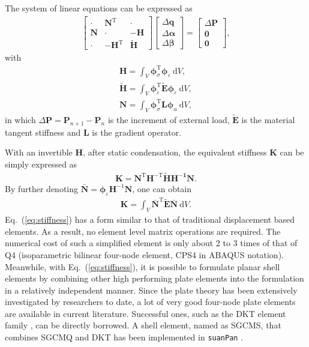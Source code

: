 \documentclass[3p,sort&compress,review,11pt,fleqn]{elsarticle}
\newcommand*{\md}[1]{\mathrm{d}#1}
\newcommand*{\mT}{\mathrm{T}}
\newcommand*{\eqsref}[1]{Eq.~(\ref{#1})}
\newcommand*{\mathbold}[1]{\bm{#1}}
\begin{document}
The system of linear equations can be expressed as
\begin{gather}
\begin{bmatrix}
	\cdot        & \mathbold{N}^\mT  & \cdot                \\
	\mathbold{N} & \cdot             & -\mathbold{H}        \\
	\cdot        & -\mathbold{H}^\mT & \tilde{\mathbold{H}}
\end{bmatrix}\begin{bmatrix}
\Delta\mathbold{q}\\\Delta\mathbold{\alpha}\\\Delta\mathbold{\beta}
\end{bmatrix}=\begin{bmatrix}
\Delta{}\mathbold{P}\\\mathbold{0}\\\mathbold{0}
\end{bmatrix},
\end{gather}
with
\begin{gather}
\mathbold{H}=\int_{V}\mathbold{\phi}_\sigma^\mT\mathbold{\phi}_\varepsilon~\md{V},\\
\tilde{\mathbold{H}}=\int_{V}\mathbold{\phi}_\varepsilon^\mT\tilde{\mathbold{E}}\mathbold{\phi}_\varepsilon~\md{V},\\
\mathbold{N}=\int_{V}\mathbold{\phi}_\sigma^\mT\mathbold{L}\mathbold{\phi}_u~\md{V},
\end{gather}
in which $\Delta{}\mathbold{P}=\mathbold{P}_{n+1}-\mathbold{P}_n$ is the increment of external load, $\tilde{\mathbold{E}}$ is the material tangent stiffness and $\mathbold{L}$ is the gradient operator.

With an invertible $\mathbold{H}$, after static condensation, the equivalent stiffness $\mathbold{K}$ can be simply expressed as
\begin{gather*}
\mathbold{K}=\mathbold{N^\mT{}H^{-\mT}\tilde{H}H^{-1}N}.
\end{gather*}
By further denoting $\mathbold{\bar{N}}=\mathbold{\phi}_\varepsilon\mathbold{H}^{-1}\mathbold{N}$, one can obtain
\begin{gather}\label{eq:stiffness}
\mathbold{K}=\int_{V}\mathbold{\bar{N}}^\mT\tilde{\mathbold{E}}\mathbold{\bar{N}}~\md{V}.
\end{gather}
\eqsref{eq:stiffness} has a form similar to that of traditional displacement based elements. As a result, no element level matrix operations are required. The numerical cost of such a simplified element is only about \num{2} to \num{3} times of that of Q4 (isoparametric bilinear four-node element, CPS4 in ABAQUS notation). Meanwhile, with \eqsref{eq:stiffness}, it is possible to formulate planar shell elements by combining other high performing plate elements into the formulation in a relatively independent manner. Since the plate theory has been extensively investigated by researchers to date, a lot of very good four-node plate elements are available in current literature. Successful ones, such as the DKT element family \citep{Batoz1980}, can be directly borrowed. A shell element, named as SGCMS, that combines SGCMQ and DKT has been implemented in \texttt{suanPan} \citep{Chang2019b}.
\end{document}
